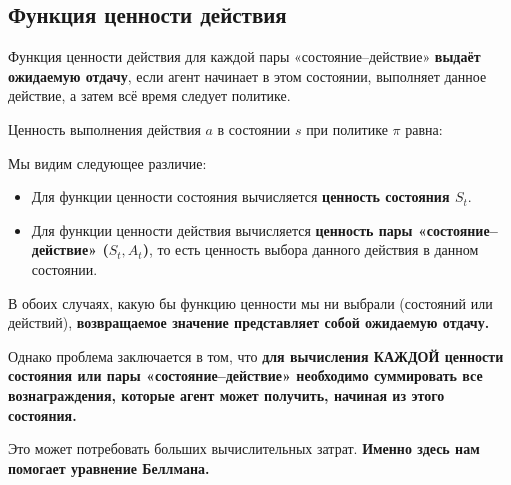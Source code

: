 \documentclass[11pt,a4paper]{article}
\begin{document}
\subsection{Функция ценности действия}\label{the-action-value-function}

Функция ценности действия для каждой пары «состояние--действие» \textbf{выдаёт ожидаемую отдачу}, если агент начинает в этом состоянии, выполняет данное действие, а затем всё время следует политике.

Ценность выполнения действия \(a\) в состоянии \(s\) при политике \(\pi\) равна:



Мы видим следующее различие:

\begin{itemize}
\tightlist
\item
  Для функции ценности состояния вычисляется \textbf{ценность состояния \(S_t\)}.
\item
  Для функции ценности действия вычисляется \textbf{ценность пары «состояние--действие» (\(S_t,A_t\))}, то есть ценность выбора данного действия в данном состоянии.
\end{itemize}


В обоих случаях, какую бы функцию ценности мы ни выбрали (состояний или действий), \textbf{возвращаемое значение представляет собой ожидаемую отдачу.}

Однако проблема заключается в том, что \textbf{для вычисления КАЖДОЙ ценности состояния или пары «состояние--действие» необходимо суммировать все вознаграждения, которые агент может получить, начиная из этого состояния.}

Это может потребовать больших вычислительных затрат. \textbf{Именно здесь нам помогает уравнение Беллмана.}
\end{document}

